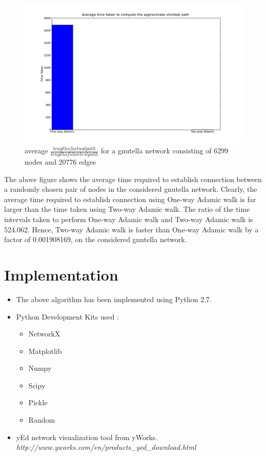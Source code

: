 \documentclass[a4paper,12pt]{article}
\begin{document}
\newpage
\begin{figure}[htp]
\centering
\includegraphics[scale=0.45]{Results/gnutellaTimePlot.png}
\caption{average $\frac{length of actual path}{length of shortest path}$ for a gnutella network consisting of 6299 nodes and 20776 edges}
\label{gnuTime}
\end{figure}
The above figure shows the average time required to establish connection between a randomly chosen pair of nodes in the considered gnutella network. Clearly, the average time required to establish connection using One-way Adamic walk is far larger than the time taken using Two-way Adamic walk. The ratio of the time intervals taken to perform One-way Adamic walk and Two-way Adamic walk is 524.062. Hence, Two-way Adamic walk is faster than One-way Adamic walk by a factor of 0.001908169, on the considered gnutella network.

\section{Implementation}
\begin{itemize}
 \item The above algorithm has been implemented using Python 2.7. 
 \item Python Development Kits used :
 \begin{itemize}
  \item NetworkX
  \item Matplotlib
  \item Numpy
  \item Scipy
  \item Pickle  
  \item Random
 \end{itemize}
\item yEd network visualization tool from yWorks.
\\\emph{http://www.yworks.com/en/products\_yed\_download.html}
\end{itemize}
\end{document}
